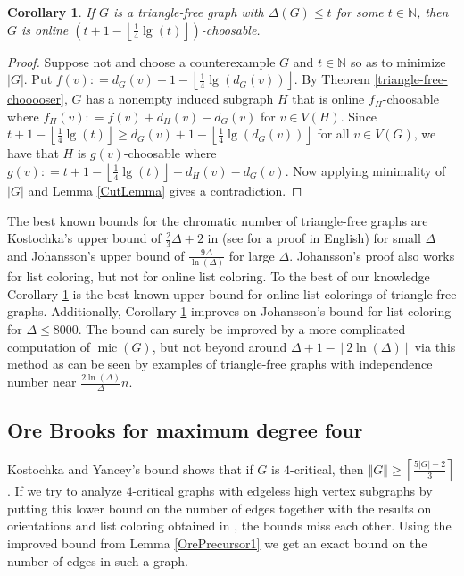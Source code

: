 \documentclass[12pt]{article}
\theoremstyle{plain}
\newtheorem{cor}[thm]{Corollary}
\theoremstyle{definition}
\theoremstyle{remark}
\newcommand{\IN}{\mathbb{N}}
\newcommand{\card}[1]{\left|#1\right|}
\newcommand{\size}[1]{\left\Vert#1\right\Vert}
\newcommand{\ceil}[1]{\left\lceil#1\right\rceil}
\newcommand{\floor}[1]{\left\lfloor#1\right\rfloor}
\newcommand{\parens}[1]{\left( #1 \right)}
\newcommand{\DefinedAs}{\mathrel{\mathop:}=}
\newcommand{\mic}{\operatorname{mic}}
\begin{document}
\begin{cor}\label{tricolor}
If $G$ is a triangle-free graph with $\Delta(G) \le t$ for some $t \in \IN$, then $G$ is online $\parens{t + 1 - \floor{\frac14 \lg(t)}}$-choosable.
\end{cor}
\begin{proof}
Suppose not and choose a counterexample $G$ and $t \in \IN$ so as to minimize $\card{G}$.  Put $f(v) \DefinedAs d_G(v) + 1 - \floor{\frac14 \lg(d_G(v))}$.  By Theorem \ref{triangle-free-chooooser}, $G$ has a nonempty induced subgraph $H$ that is online $f_H$-choosable where $f_H(v) \DefinedAs f(v) + d_H(v) - d_G(v)$ for $v \in V(H)$.  Since $t + 1 - \floor{\frac14 \lg(t)} \ge d_G(v) + 1 - \floor{\frac14 \lg(d_G(v))}$ for all $v \in V(G)$, we have that $H$ is $g(v)$-choosable where $g(v) \DefinedAs t + 1 - \floor{\frac14 \lg(t)} + d_H(v) - d_G(v)$.  Now applying minimality of $\card{G}$ and Lemma \ref{CutLemma} gives a contradiction.
\end{proof}

The best known bounds for the chromatic number of triangle-free graphs are Kostochka's upper bound of $\frac23 \Delta + 2$ in \cite{kostochka1982modification} (see \cite{rabern2010destroying} for a proof in English) for small $\Delta$ and Johansson's upper bound of $\frac{9\Delta}{\ln(\Delta)}$ for large $\Delta$.  Johansson's proof also works for list coloring, but not for online list coloring.  To the best of our knowledge Corollary \ref{tricolor} is the best known upper bound for online list colorings of triangle-free graphs.  Additionally, Corollary \ref{tricolor} improves on Johansson's bound for list coloring for $\Delta \le 8000$.  The bound can surely be improved by a more complicated computation of $\mic(G)$, but not beyond around $\Delta + 1 - \floor{2\ln(\Delta)}$ via this method as can be seen by examples of triangle-free graphs with independence number near $\frac{2\ln(\Delta)}{\Delta}n$.

\subsection{Ore Brooks for maximum degree four}
Kostochka and Yancey's bound \cite{kostochkayancey2012ore} shows that if $G$ is $4$-critical, then $\size{G} \geq \ceil{\frac{5\card{G}-2}{3}}$.  If we try to analyze $4$-critical graphs with edgeless high vertex subgraphs by putting this lower bound on the number of edges together with the results on orientations and list coloring obtained in \cite{kostochkayancey2012ore}, the bounds miss each other.  Using the improved bound from Lemma \ref{OrePrecursor1} we get an exact bound on the number of edges in such a graph.
\end{document}
